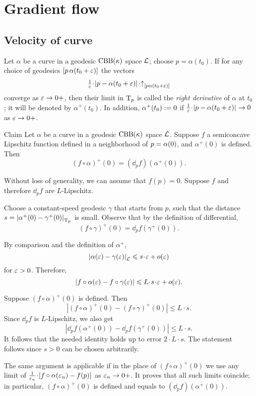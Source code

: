 \chapter{Gradient flow}\label{chap:GF}

\section{Velocity of curve}

Let $\alpha$ be a curve in a geodesic $\mathrm{CBB}(\kappa)$ space $\mathcal{L}$;
choose $p=\alpha(t_0)$.
If for any choice of geodesics $[p\,\alpha(t_0+\varepsilon)]$ the vectors 
\[\tfrac{1}{\eps}\cdot\dist{p}{\alpha(t_0+\eps)}{}\cdot\dir p{\alpha(t_0+\eps)}\]
converge as $\varepsilon\to 0+$, then their limit in $\mathrm{T}_p$ is called the \emph{right derivative} of $\alpha$ at $t_0$; it will be denoted by $\alpha^+(t_0)$.
In addition, $\alpha^+(t_0)\mathrel{:=}0$
if $\tfrac{1}{\eps}\cdot\dist{p}{\alpha(t_0+\eps)}{}\to 0$ as $\varepsilon\to 0+$.

\begin{thm}{Claim}\label{clm:fa'=dfa'}
Let $\alpha$ be a curve in a geodesic $\mathrm{CBB}(\kappa)$ space $\mathcal{L}$.
Suppose $f$ a semiconcave Lipschitz function
defined in a neighborhood of $p\z=\alpha(0)$,
and $\alpha^+(0)$ is defined.
Then 
\[(f\circ\alpha)^+(0)
=
(\dd_pf)(\alpha^+(0)).\]
\end{thm}

Without loss of generality, we can assume that $f(p)=0$.
Suppose $f$ and therefore $\dd_pf$ are $L$-Lipschitz.

Choose a constant-speed geodesic $\gamma$ that starts from $p$,
such that the distance
$s=\dist{\alpha^+(0)}{\gamma^+(0)}{\T_p}$
is small.
Observe that by the definition of differential,
\[(f\circ\gamma)^+(0)=\dd_pf(\gamma^+(0)).\]

By comparison and the definition of $\alpha^+$,
\[\dist{\alpha(\eps)}{\gamma(\eps)}{\spc{L}}\le s\cdot\eps+o(\eps)\]
for $\varepsilon>0$.
Therefore,
\[|f\circ\alpha(\eps)-f\circ\gamma(\eps)|\le L\cdot s\cdot\eps+o(\eps).\]

Suppose $(f\circ\alpha)^+(0)$ is defined.
Then
\[|(f\circ\alpha)^+(0)-(f\circ\gamma)^+(0)|\le L\cdot s.\]
Since $\dd_pf$ is $L$-Lipschitz, we also get 
\[|\dd_pf(\alpha^+(0))-\dd_pf(\gamma^+(0))|\le L\cdot s.\]
It follows that the needed identity holds up to error $2\cdot L\cdot s$.
The statement follows since $s>0$ can be chosen arbitrarily.

The same argument is applicable if in the place of $(f\circ\alpha)^+(0)$
we use any limit of $\tfrac1{\eps_n}\cdot [f\circ\alpha(\eps_n)-f(p)]$ as $\varepsilon_n\to 0+$.
It proves that all such limits coincide; in particular, $(f\circ\alpha)^+(0)$ is defined and equals to $(\dd_pf)(\alpha^+(0))$.
\qeds


